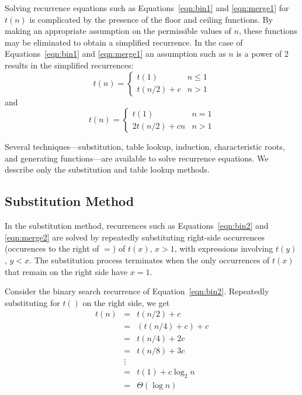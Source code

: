 Solving recurrence equations such as Equations~\ref{eqn:bin1} and \ref{eqn:merge1}
for $t(n)$ is complicated by the presence of the floor and ceiling functions.
By making an appropriate assumption on the permissible values of $n$, these
functions may be eliminated to obtain a simplified recurrence. In the
case of Equations~\ref{eqn:bin1} and \ref{eqn:merge1} an assumption such
as $n$ is a power of 2 results in the simplified recurrences:
\begin{equation}\label{eqn:bin2}
t(n) =  \left \{
         \begin{array}{ll}
            t(1) & n \leq 1\\
    t(n / 2)+c &  n > 1
          \end{array}
         \right.
\end{equation}
and
\begin{equation}\label{eqn:merge2}
t(n) =  \left \{
         \begin{array}{ll}
            t(1) & n = 1\\
    2t( n / 2)+cn &  n > 1
          \end{array}
         \right.
\end{equation}

Several techniques---substitution,
table lookup,
induction,
characteristic roots, and generating functions---are
available to solve recurrence equations.
We describe only the substitution and table lookup
methods.

\subsection{Substitution Method}
In the substitution method, recurrences such as Equations~\ref{eqn:bin2} and
\ref{eqn:merge2} are solved by repeatedly substituting right-side
occurrences (occurences to the right of $=$)
of $t(x)$, $x > 1$, with expressions involving $t(y)$, $y < x$.
The substitution process terminates when the only occurrences of $t(x)$ that
remain on the right side  have $x = 1$.

Consider the binary search recurrence of Equation~\ref{eqn:bin2}.
Repeatedly substituting for $t()$ on the right side, we get
\begin{eqnarray*}
t(n)  &=&  t(n/2) + c\\
 &=&  (t(n /4) + c) + c \\
 &=&  t(n /4) +  2c \\
 &=&  t(n /8) +  3c \\
 &\vdots\\
 &=&   t(1) + c\log_2n  \\
 &=&  \Theta(\log n)
\end{eqnarray*}

